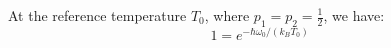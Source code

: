 \documentclass[11pt,a4paper]{article}
\makeatletter
\renewenvironment{proof}[1][\proofname]{\par
  \pushQED{\qed}%
  \normalfont \topsep6\p@\@plus6\p@\relax
  \trivlist
  \item[\hskip\labelsep
        \itshape
    #1\@addpunct{.}]\ignorespaces
}{%
  \popQED\endtrivlist\@endpefalse
}
\makeatother
\begin{document}
\begin{proof}
At the reference temperature $T_0$, where $p_1 = p_2 = \frac{1}{2}$, we have:
\begin{equation}
1 = e^{-\hbar \omega_0 / (k_B T_0)} %
\label{eq:equiprobable_cond}
\end{equation}


\end{proof}
\end{document}
